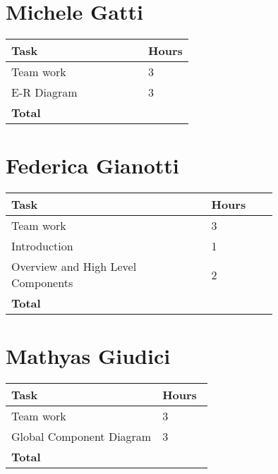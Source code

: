 \section{Michele Gatti}

\smallskip
\begin{center}
\begin{tabular}{ | p{0.75\linewidth} | l | }
  \hline
    \textbf{Task} & \textbf{Hours }\\ \hline
     Team work & 3 \\ \hline
     E-R Diagram & 3 \\ \hline
    \textbf{Total} & \textbf{} \\ \hline
\end{tabular}
\end{center}
\smallskip


\section{Federica Gianotti}

\smallskip
\begin{center}
\begin{tabular}{ | p{0.75\linewidth} | l | }
  \hline
    \textbf{Task} & \textbf{Hours }\\ \hline
    Team work & 3 \\ \hline
    Introduction & 1 \\ \hline
    Overview and High Level Components & 2 \\ \hline
   \textbf{Total} & \textbf{} \\ \hline
\end{tabular}
\end{center}
\smallskip

\section{Mathyas Giudici}

\smallskip
\begin{center}
\begin{tabular}{ | p{0.75\linewidth} | l | }
  \hline
    \textbf{Task} & \textbf{Hours }\\ \hline
    Team work & 3 \\ \hline
    Global Component Diagram & 3 \\ \hline
   \textbf{Total} & \textbf{} \\ \hline
\end{tabular}
\end{center}

\clearpage
